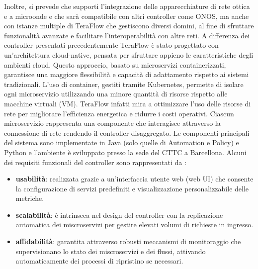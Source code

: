 Inoltre, si prevede che supporti l'integrazione delle 
apparecchiature di rete ottica e a microonde e che sarà compatibile con altri controller come ONOS, ma anche con istanze multiple di TeraFlow che gestiscono diversi domini, al fine di sfruttare funzionalità avanzate e facilitare l'interoperabilità con altre reti.
\newline A differenza dei controller presentati precedentemente TeraFlow è stato progettato con un'architettura cloud-native, pensata per sfruttare appieno le caratteristiche degli ambienti cloud.
Questo approccio, basato su microservizi containerizzati, garantisce una maggiore flessibilità e capacità di adattamento rispetto ai sistemi tradizionali.
\newline L'uso di container, gestiti tramite Kubernetes, permette di isolare ogni microservizio utilizzando una minore quantità di risorse rispetto alle macchine virtuali (VM).
\newline TeraFlow infatti mira a ottimizzare l'uso delle risorse di rete per migliorare l'efficienza energetica e ridurre i costi operativi.
Ciascun microservizio rappresenta una componente che interagisce attraverso la connessione di rete rendendo il controller disaggregato.
Le componenti principali del sistema sono implementate in Java (solo quelle di Automation e Policy) e Python e l'ambiente è sviluppato presso la sede del CTTC a Barcellona. 
\newline Alcuni dei requisiti funzionali del controller sono rappresentati da \cite{D22}:
\begin{itemize} 
    \item \textbf{usabilità}: realizzata grazie a un'interfaccia utente web (web UI) che consente la configurazione di servizi predefiniti e visualizzazione personalizzabile delle metriche.
    \item \textbf{scalabilità}: è intrinseca nel design del controller con la replicazione automatica dei miscroservizi per gestire elevati volumi di richieste in ingresso.
    \item \textbf{affidabilità}: garantita attraverso robusti meccanismi di monitoraggio che supervisionano lo stato dei miscroservizi e dei flussi, attivando automaticamente dei processi di ripristino se necessari.
\end{itemize}
